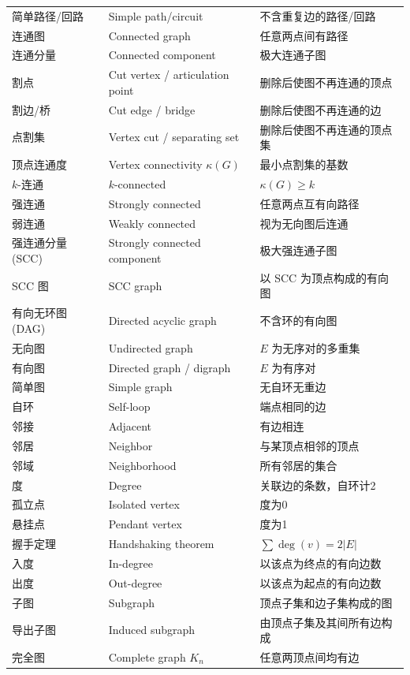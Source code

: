 \documentclass[UTF8,11pt,a4paper]{ctexbook}   %
\theoremstyle{definition}
\begin{document}
\begin{longtable}{|p{4.8cm}|p{4.8cm}|p{4.8cm}|}
简单路径/回路 & Simple path/circuit & 不含重复边的路径/回路 \\
连通图 & Connected graph & 任意两点间有路径 \\
连通分量 & Connected component & 极大连通子图 \\
割点 & Cut vertex / articulation point & 删除后使图不再连通的顶点 \\
割边/桥 & Cut edge / bridge & 删除后使图不再连通的边 \\
点割集 & Vertex cut / separating set & 删除后使图不再连通的顶点集 \\
顶点连通度 & Vertex connectivity $\kappa(G)$ & 最小点割集的基数 \\
$k$-连通 & $k$-connected & $\kappa(G) \geq k$ \\
强连通 & Strongly connected & 任意两点互有向路径 \\
弱连通 & Weakly connected & 视为无向图后连通 \\
强连通分量 (SCC) & Strongly connected component & 极大强连通子图 \\
SCC 图 & SCC graph & 以 SCC 为顶点构成的有向图 \\
有向无环图 (DAG) & Directed acyclic graph & 不含环的有向图 \\
无向图 & Undirected graph & $E$ 为无序对的多重集 \\
有向图 & Directed graph / digraph & $E$ 为有序对 \\
简单图 & Simple graph & 无自环无重边 \\
自环 & Self-loop & 端点相同的边 \\
邻接 & Adjacent & 有边相连 \\
邻居 & Neighbor & 与某顶点相邻的顶点 \\
邻域 & Neighborhood & 所有邻居的集合 \\
度 & Degree & 关联边的条数，自环计2 \\
孤立点 & Isolated vertex & 度为0 \\
悬挂点 & Pendant vertex & 度为1 \\
握手定理 & Handshaking theorem & $\sum \deg(v) = 2|E|$ \\
入度 & In-degree & 以该点为终点的有向边数 \\
出度 & Out-degree & 以该点为起点的有向边数 \\
子图 & Subgraph & 顶点子集和边子集构成的图 \\
导出子图 & Induced subgraph & 由顶点子集及其间所有边构成 \\
完全图 & Complete graph $K_n$ & 任意两顶点间均有边 \\

\end{longtable}
\end{document}
